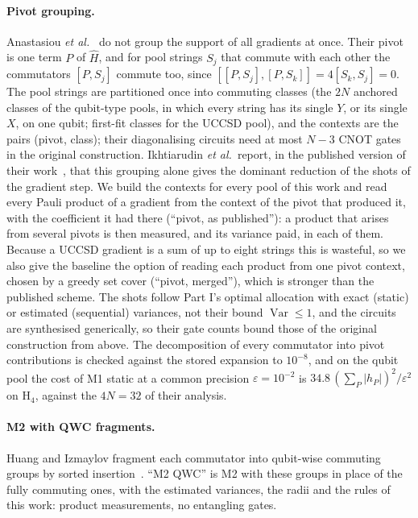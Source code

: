 \documentclass[aps,pra,reprint,superscriptaddress,nofootinbib]{revtex4-2}
\begin{document}
\paragraph{Pivot grouping.} Anastasiou \textit{et al.}~\cite{anastasiou2023} do not group the support of all gradients at once. Their pivot is one term $P$ of $\hat H$, and for pool strings $S_j$ that commute with each other the commutators $[P,S_j]$ commute too, since $[[P,S_j],[P,S_k]]=4[S_k,S_j]=0$. The pool strings are partitioned once into commuting classes (the $2N$ anchored classes of the qubit-type pools, in which every string has its single $Y$, or its single $X$, on one qubit; first-fit classes for the UCCSD pool), and the contexts are the pairs (pivot, class); their diagonalising circuits need at most $N-3$ CNOT gates in the original construction. Ikhtiarudin \textit{et al.}\ report, in the published version of their work~\cite{ikhtiarudin2025}, that this grouping alone gives the dominant reduction of the shots of the gradient step. We build the contexts for every pool of this work and read every Pauli product of a gradient from the context of the pivot that produced it, with the coefficient it had there (``pivot, as published''): a product that arises from several pivots is then measured, and its variance paid, in each of them. Because a UCCSD gradient is a sum of up to eight strings this is wasteful, so we also give the baseline the option of reading each product from one pivot context, chosen by a greedy set cover (``pivot, merged''), which is stronger than the published scheme. The shots follow Part I's optimal allocation with exact (static) or estimated (sequential) variances, not their bound $\operatorname{Var}\le1$, and the circuits are synthesised generically, so their gate counts bound those of the original construction from above. The decomposition of every commutator into pivot contributions is checked against the stored expansion to $10^{-8}$, and on the qubit pool the cost of M1 static at a common precision $\varepsilon=10^{-2}$ is $34.8\,(\sum_P\lvert h_P\rvert)^2/\varepsilon^2$ on H$_4$, against the $4N=32$ of their analysis.

\paragraph{M2 with QWC fragments.} Huang and Izmaylov fragment each commutator into qubit-wise commuting groups by sorted insertion~\cite{huang2026}. ``M2 QWC'' is M2 with these groups in place of the fully commuting ones, with the estimated variances, the radii and the rules of this work: product measurements, no entangling gates.
\end{document}

